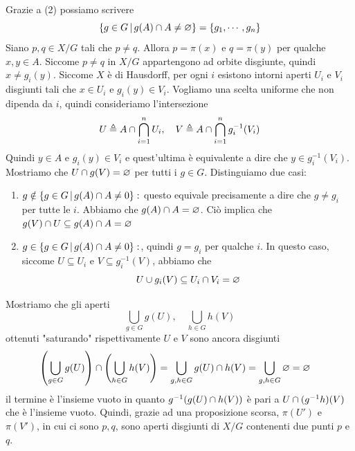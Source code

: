 \documentclass[a4paper]{article}
\begin{document}
\begin{snippetproof}{}
    Grazie a (2) possiamo scrivere
    \[
        \{g\in G \,|\, g(A) \cap A \neq \varnothing\}
        = \{g_1, \cdots, g_n\}
    \]
    Siano \(p, q \in X/G\) tali che \(p \neq q\).
    Allora \(p = \pi(x)\) e \(q = \pi(y)\)
    per qualche \(x,y \in A\).
    Siccome \(p \neq q\) in \(X/G\) appartengono ad orbite disgiunte,
    quindi \(x \neq g_i(y)\).
    Siccome \(X\) è di Hausdorff, per ogni \(i\) esistono intorni aperti
    \(U_i\) e \(V_i\) disgiunti tali che \(x\in U_i\) e \(g_i(y) \in V_i\).
    Vogliamo una scelta uniforme che non dipenda da \(i\), quindi consideriamo l'intersezione
    \[
        U \triangleq A \cap \bigcap_{i=1}^n U_i, \quad
        V \triangleq A \cap \bigcap_{i=1}^n g_i^{-1}(V_i)
    \] 
    Quindi \(y \in A\) e \(g_i(y) \in V_i\) e quest'ultima è equivalente a dire che
    \(y \in g_i^{-1}(V_i)\).
    Mostriamo che \(U \cap g(V) = \varnothing\) per tutti i \(g\in G\).
    Distinguiamo due casi:
    \begin{enumerate}
        \item \(g \notin \{g\in G \,|\, g(A) \cap A \neq 0\}:\)
        questo equivale precisamente a dire che \(g \neq g_i\) per tutte le \(i\).
        Abbiamo che \(g(A) \cap A = \varnothing\).
        Ciò implica che \(g(V) \cap U \subseteq g(A) \cap A = \varnothing\)
        \item \(g \in \{g\in G \,|\, g(A) \cap A \neq 0\}:\),
        quindi \(g = g_i\) per qualche \(i\).
        In questo caso, siccome \(U \subseteq U_i\) e \(V \subseteq g_i^{-1}(V)\), abbiamo che
        \[
            U \cup g_i(V) \subseteq U_i \cap V_i = \varnothing
        \]
    \end{enumerate}
    Mostriamo che gli aperti
    \[
        \bigcup_{g\in G} g(U), \quad \bigcup_{h\in G}h(V)
    \]
    ottenuti "saturando" rispettivamente \(U\) e \(V\) sono ancora disgiunti
    \begin{align*}
        \left(
            \bigcup_{g\in G} g(U)
        \right)
        \cap
        \left(
            \bigcup_{h\in G} h(V)
        \right)
        &= \bigcup_{g,h \in G} g(U) \cap h(V)
        = \bigcup_{g,h \in G} \varnothing = \varnothing
    \end{align*}
    il termine è l'insieme vuoto in quanto \(g^{-1}(g(U) \cap h(V))\)
    è pari a \(U \cap (g^{-1}h)(V)\) che è l'insieme vuoto.
    Quindi, grazie ad una proposizione scorsa, \(\pi(U')\) e \(\pi(V')\),
    in cui ci sono \(p,q\), sono aperti disgiunti di \(X/G\) contenenti due punti \(p\) e \(q\).
\end{snippetproof}
\end{document}

